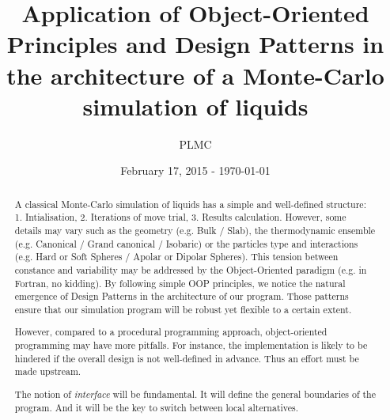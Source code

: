 \documentclass[a4paper, 12pt]{article}
\title{Application of Object-Oriented Principles and Design Patterns in the architecture of
    a Monte-Carlo simulation of liquids}
\author{PLMC}
\date{February 17, 2015 - \today{}}
\def\buildMode{buildmissing}
\begin{document}
    \maketitle

    \begin{abstract}
        A classical Monte-Carlo simulation of liquids has a simple and well-defined structure:
        1. Intialisation, 2. Iterations of move trial, 3. Results calculation.
        However, some details may vary such as the geometry (e.g. Bulk / Slab),
        the thermodynamic ensemble (e.g. Canonical / Grand canonical / Isobaric)
        or the particles type and interactions (e.g. Hard or Soft Spheres /
        Apolar or Dipolar Spheres).
        This tension between constance and variability may be addressed by
        the Object-Oriented paradigm (e.g. in Fortran, no kidding).
        By following simple OOP principles, we notice the natural emergence of Design Patterns
        in the architecture of our program.
        Those patterns ensure that our simulation program will be robust yet flexible
        to a certain extent.

        However, compared to a procedural programming approach, object-oriented programming
        may have more pitfalls.
        For instance, the implementation is likely to be hindered if the overall design is
        not well-defined in advance. Thus an effort must be made upstream.

        The notion of \emph{interface} will be fundamental. It will define the general boundaries of
        the program. And it will be the key to switch between local alternatives.
    \end{abstract}

    \begin{landscape}
        \begin{figure}[htb]
            \centering
            
            \caption{}
        \end{figure}
    \end{landscape}

    \begin{landscape}
        \begin{figure}[htb]
            \centering
            
            \caption{}
        \end{figure}
    \end{landscape}
\end{document}

